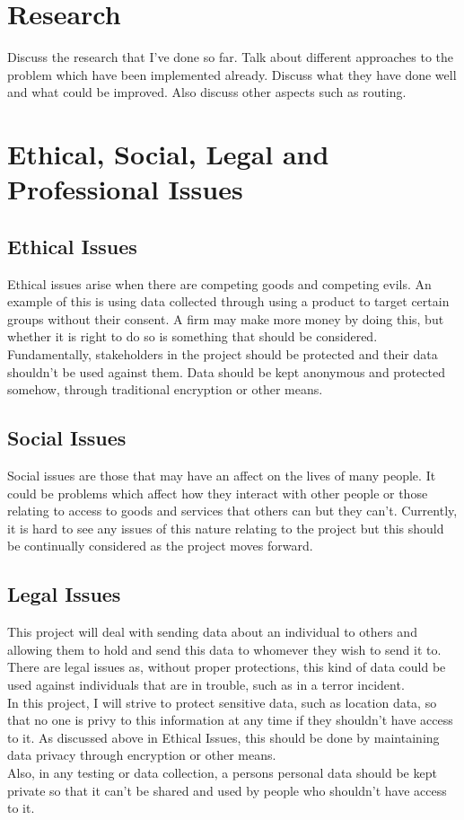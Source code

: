 \documentclass{report}
\begin{document}
\chapter*{Research}

Discuss the research that I've done so far. Talk about different approaches to the 
problem which have been implemented already. Discuss what they have done well and what 
could be improved. Also discuss other aspects such as routing.

\chapter*{Ethical, Social, Legal and Professional Issues}

\section*{Ethical Issues}

Ethical issues arise when there are competing goods and competing evils. An example of this 
is using data collected through using a product to target certain groups without their consent. 
A firm may make more money by doing this, but whether it is right to do so is something that 
should be considered. Fundamentally, stakeholders in the project should be protected and their 
data shouldn't be used against them. Data should be kept anonymous and protected somehow, through 
traditional encryption or other means. 

\section*{Social Issues}

Social issues are those that may have an affect on the lives of many people. It could be problems which 
affect how they interact with other people or those relating to access to goods and services that others can 
but they can't. Currently, it is hard to see any issues of this nature relating to the project but this should 
be continually considered as the project moves forward.

\section*{Legal Issues}

This project will deal with sending data about an individual to others and allowing them to hold and send this 
data to whomever they wish to send it to. There are legal issues as, without proper protections, this kind of 
data could be used against individuals that are in trouble, such as in a terror incident. 
\bigskip
\\
In this project, I will strive to protect sensitive data, such as location data, so that no one is privy to this 
information at any time if they shouldn't have access to it. As discussed above in Ethical Issues, this should be 
done by maintaining data privacy through encryption or other means.
\bigskip
\\
Also, in any testing or data collection, a persons personal data should be kept private so that it can't be shared 
and used by people who shouldn't have access to it.  
\end{document}
